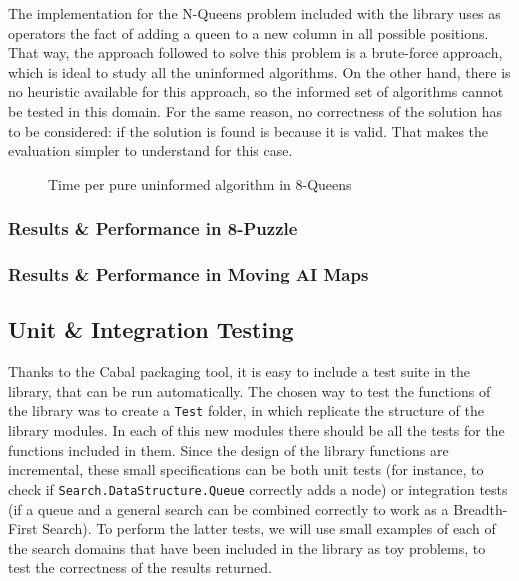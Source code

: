 The implementation for the N-Queens problem included with the library uses as
operators the fact of adding a queen to a new column in all possible positions.
That way, the approach followed to solve this problem is a brute-force
approach, which is ideal to study all the uninformed algorithms. On the other
hand, there is no heuristic available for this approach, so the informed set of
algorithms cannot be tested in this domain. For the same reason, no correctness
of the solution has to be considered: if the solution is found is because it is
valid. That makes the evaluation simpler to understand for this case.\\

\begin{figure}[htbp!]
  \centering
  \caption{Time per pure uninformed algorithm in 8-Queens}
  \label{nq:time}
\end{figure}


\subsubsection{Results \& Performance in 8-Puzzle}

\subsubsection{Results \& Performance in Moving AI Maps}


\subsection{Unit \& Integration Testing}

Thanks to the Cabal packaging tool, it is easy to include a test suite in the
library, that can be run automatically. The chosen way to test the functions of
the library was to create a \texttt{Test} folder, in which replicate the
structure of the library modules. In each of this new modules there should be
all the tests for the functions included in them. Since the design of the
library functions are incremental, these small specifications can be both unit
tests (for instance, to check if \texttt{Search.DataStructure.Queue} correctly
adds a node) or integration tests (if a queue and a general search can be
combined correctly to work as a Breadth-First Search). To perform the latter
tests, we will use small examples of each of the search domains that have been
included in the library as toy problems, to test the correctness of the results
returned.\\

